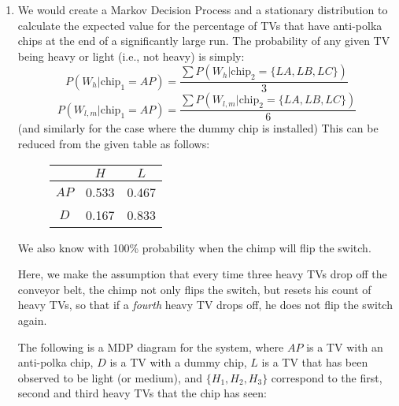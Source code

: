 \documentclass{article}
\begin{document}
\begin{enumerate}[start=0]
\begin{enumerate}
\item{}
    We would create a Markov Decision Process and a stationary distribution to
    calculate the expected value for the percentage of TVs that have anti-polka
    chips at the end of a significantly large run. The probability of any given
    TV being heavy or light (i.e., not heavy) is simply:
    $$ P(W_h|\text{chip}_1 = AP) =
    \frac{\sum{P(W_h|\text{chip}_2 = \{LA, LB, LC\})}}{3}$$
    $$ P(W_{l,m}|\text{chip}_1 = AP) =
    \frac{\sum{P(W_{l,m}|\text{chip}_2 = \{LA, LB, LC\})}}{6}$$
    (and similarly for the case where the dummy chip is installed)
    This can be reduced from the given table as follows:

    \begin{figure}[H]
    \centering
    \begin{tabular}{|c|c|c|}
    \hline
    & $H$ & $L$ \\\hline
    $AP$ & 0.533 & 0.467 \\\hline
    $D$ & 0.167 & 0.833 \\\hline
    \end{tabular}
    \end{figure}

    We also know with 100\% probability when the chimp will flip the switch.

    Here, we make the assumption that every time three heavy TVs drop off the
    conveyor belt, the chimp not only flips the switch, but resets his count of
    heavy TVs, so that if a \emph{fourth} heavy TV drops off, he does not flip
    the switch again.

    The following is a MDP diagram for the system, where $AP$ is a TV with an
    anti-polka chip, $D$ is a TV with a dummy chip, $L$ is a TV that has been
    observed to be light (or medium), and $\{H_1, H_2, H_3\}$ correspond to the
    first, second and third heavy TVs that the chip has seen:


\end{enumerate}
\end{enumerate}
\end{document}
